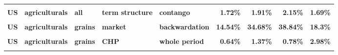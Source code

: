 \documentclass[
  authoryear,
  preprint,
  3p]{elsarticle}
\begin{document}
\begin{landscape}
\begin{longtable}[t]{>{}l>{}l>{}l>{}l>{}l>{}r>{}r>{}r>{}r}
\textbf{\cellcolor{gray!10}{US}} & \textbf{\cellcolor{gray!10}{agriculturals}} & \textbf{\cellcolor{gray!10}{all}} & \textbf{\cellcolor{gray!10}{term structure}} & \textbf{\cellcolor{gray!10}{backwardation}} & \textcolor[HTML]{4285f4}{\textbf{\cellcolor{gray!10}{1.2\%}}} & \textcolor[HTML]{4285f4}{\textbf{\cellcolor{gray!10}{1.27\%}}} & \textcolor[HTML]{4285f4}{\textbf{\cellcolor{gray!10}{1.93\%}}} & \textcolor[HTML]{4285f4}{\textbf{\cellcolor{gray!10}{3.55\%}}}\\
\addlinespace
\textbf{US} & \textbf{agriculturals} & \textbf{all} & \textbf{term structure} & \textbf{contango} & \textcolor[HTML]{4285f4}{\textbf{1.72\%}} & \textcolor[HTML]{4285f4}{\textbf{1.91\%}} & \textcolor[HTML]{4285f4}{\textbf{2.15\%}} & \textcolor[HTML]{4285f4}{\textbf{1.69\%}}\\
\textbf{\cellcolor{gray!10}{US}} & \textbf{\cellcolor{gray!10}{agriculturals}} & \textbf{\cellcolor{gray!10}{grains}} & \textbf{\cellcolor{gray!10}{market}} & \textbf{\cellcolor{gray!10}{whole period}} & \textcolor[HTML]{4285f4}{\textbf{\cellcolor{gray!10}{16.44\%}}} & \textcolor[HTML]{4285f4}{\textbf{\cellcolor{gray!10}{29.28\%}}} & \textcolor[HTML]{4285f4}{\textbf{\cellcolor{gray!10}{42.09\%}}} & \textcolor[HTML]{4285f4}{\textbf{\cellcolor{gray!10}{19.27\%}}}\\
\textbf{US} & \textbf{agriculturals} & \textbf{grains} & \textbf{market} & \textbf{backwardation} & \textcolor[HTML]{4285f4}{\textbf{14.54\%}} & \textcolor[HTML]{4285f4}{\textbf{34.68\%}} & \textcolor[HTML]{4285f4}{\textbf{38.84\%}} & \textcolor[HTML]{4285f4}{\textbf{18.3\%}}\\
\textbf{\cellcolor{gray!10}{US}} & \textbf{\cellcolor{gray!10}{agriculturals}} & \textbf{\cellcolor{gray!10}{grains}} & \textbf{\cellcolor{gray!10}{market}} & \textbf{\cellcolor{gray!10}{contango}} & \textcolor[HTML]{4285f4}{\textbf{\cellcolor{gray!10}{18.73\%}}} & \textcolor[HTML]{4285f4}{\textbf{\cellcolor{gray!10}{23.95\%}}} & \textcolor[HTML]{4285f4}{\textbf{\cellcolor{gray!10}{44.4\%}}} & \textcolor[HTML]{4285f4}{\textbf{\cellcolor{gray!10}{20.71\%}}}\\
\textbf{US} & \textbf{agriculturals} & \textbf{grains} & \textbf{CHP} & \textbf{whole period} & \textcolor[HTML]{4285f4}{\textbf{0.64\%}} & \textcolor[HTML]{4285f4}{\textbf{1.37\%}} & \textcolor[HTML]{4285f4}{\textbf{0.78\%}} & \textcolor[HTML]{4285f4}{\textbf{2.98\%}}\\
\addlinespace
\textbf{\cellcolor{gray!10}{US}} & \textbf{\cellcolor{gray!10}{agriculturals}} & \textbf{\cellcolor{gray!10}{grains}} & \textbf{\cellcolor{gray!10}{CHP}} & \textbf{\cellcolor{gray!10}{backwardation}} & \textcolor[HTML]{4285f4}{\textbf{\cellcolor{gray!10}{0.77\%}}} & \textcolor[HTML]{4285f4}{\textbf{\cellcolor{gray!10}{2.63\%}}} & \textcolor[HTML]{4285f4}{\textbf{\cellcolor{gray!10}{1.04\%}}} & \textcolor[HTML]{4285f4}{\textbf{\cellcolor{gray!10}{5.46\%}}}\\

\end{longtable}
\end{landscape}
\end{document}
